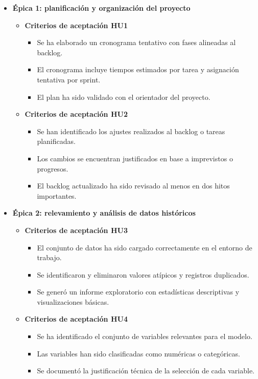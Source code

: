 \documentclass[
11pt, %
]{charter}
\begin{document}
\begin{itemize}
  \item \textbf{Épica 1: planificación y organización del proyecto}
    \begin{itemize}
      \item \textbf{Criterios de aceptación HU1}
      \begin{itemize}
        \item Se ha elaborado un cronograma tentativo con fases alineadas al backlog.
        \item El cronograma incluye tiempos estimados por tarea y asignación tentativa por sprint.
        \item El plan ha sido validado con el orientador del proyecto.
      \end{itemize}

      \item \textbf{Criterios de aceptación HU2}
      \begin{itemize}
        \item Se han identificado los ajustes realizados al backlog o tareas planificadas.
        \item Los cambios se encuentran justificados en base a imprevistos o progresos.
        \item El backlog actualizado ha sido revisado al menos en dos hitos importantes.
      \end{itemize}
    \end{itemize}
    
  \item \textbf{Épica 2: relevamiento y análisis de datos históricos}
    \begin{itemize}
      \item \textbf{Criterios de aceptación HU3}
      \begin{itemize}
        \item El conjunto de datos ha sido cargado correctamente en el entorno de trabajo.
        \item Se identificaron y eliminaron valores atípicos y registros duplicados.
        \item Se generó un informe exploratorio con estadísticas descriptivas y visualizaciones básicas.
      \end{itemize}
      \item \textbf{Criterios de aceptación HU4}
      \begin{itemize}
        \item Se ha identificado el conjunto de variables relevantes para el modelo.
        \item Las variables han sido clasificadas como numéricas o categóricas.
        \item Se documentó la justificación técnica de la selección de cada variable.
      \end{itemize}
    \end{itemize}


\end{itemize}
\end{document}
